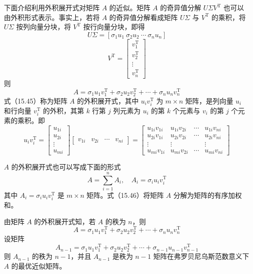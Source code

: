 \documentclass[UTF8,12pt,a4paper,fontset=fandol]{ctexart}
\begin{document}
下面介绍利用外积展开式对矩阵 $A$ 的近似。矩阵 $A$ 的奇异值分解 $U\Sigma V^{\mathrm{T}}$ 也可以由外积形式表示。事实上，若将 $A$ 的奇异值分解看成矩阵 $U\Sigma$ 与 $V^{\mathrm{T}}$ 的乘积，将 $U\Sigma$ 按列向量分块，将 $V^{\mathrm{T}}$ 按行向量分块，即得
\[
U\Sigma=[\sigma_1u_1\ \sigma_2u_2\ \cdots\ \sigma_nu_n]
\]
\[
V^{\mathrm{T}}=
\begin{bmatrix}
v_1^{\mathrm{T}}\\
v_2^{\mathrm{T}}\\
\vdots\\
v_n^{\mathrm{T}}
\end{bmatrix}
\]
则
\begin{equation}
A=\sigma_1u_1v_1^{\mathrm{T}}+\sigma_2u_2v_2^{\mathrm{T}}+\cdots+\sigma_nu_nv_n^{\mathrm{T}}
\tag{15.45}
\end{equation}
式（15.45）称为矩阵 $A$ 的外积展开式，其中 $u_iv_i^{\mathrm{T}}$ 为 $m\times n$ 矩阵，是列向量 $u_i$ 和行向量 $v_i^{\mathrm{T}}$ 的外积，其第 $k$ 行第 $j$ 列元素为 $u_i$ 的第 $k$ 个元素与 $v_i$ 的第 $j$ 个元素的乘积。即
\[
u_iv_i^{\mathrm{T}}=
\begin{bmatrix}
u_{1i}\\
u_{2i}\\
\vdots\\
u_{mi}
\end{bmatrix}
\begin{bmatrix}
v_{1i}&v_{2i}&\cdots&v_{ni}
\end{bmatrix}
=
\begin{bmatrix}
u_{1i}v_{1i}&u_{1i}v_{2i}&\cdots&u_{1i}v_{ni}\\
u_{2i}v_{1i}&u_{2i}v_{2i}&\cdots&u_{2i}v_{ni}\\
\vdots&\vdots&&\vdots\\
u_{mi}v_{1i}&u_{mi}v_{2i}&\cdots&u_{mi}v_{ni}
\end{bmatrix}
\]

$A$ 的外积展开式也可以写成下面的形式
\begin{equation}
A=\sum_{i=1}^n A_i,\quad A_i=\sigma_iu_iv_i^{\mathrm{T}}
\tag{15.46}
\end{equation}
其中 $A_i=\sigma_iu_iv_i^{\mathrm{T}}$ 是 $m\times n$ 矩阵。式（15.46）将矩阵 $A$ 分解为矩阵的有序加权和。

由矩阵 $A$ 的外积展开式知，若 $A$ 的秩为 $n$，则
\begin{equation}
A=\sigma_1u_1v_1^{\mathrm{T}}+\sigma_2u_2v_2^{\mathrm{T}}+\cdots+\sigma_nu_nv_n^{\mathrm{T}}
\tag{15.47}
\end{equation}
设矩阵
\[
A_{n-1}=\sigma_1u_1v_1^{\mathrm{T}}+\sigma_2u_2v_2^{\mathrm{T}}+\cdots+\sigma_{n-1}u_{n-1}v_{n-1}^{\mathrm{T}}
\]
则 $A_{n-1}$ 的秩为 $n-1$，并且 $A_{n-1}$ 是秩为 $n-1$ 矩阵在弗罗贝尼乌斯范数意义下 $A$ 的最优近似矩阵。
\end{document}
